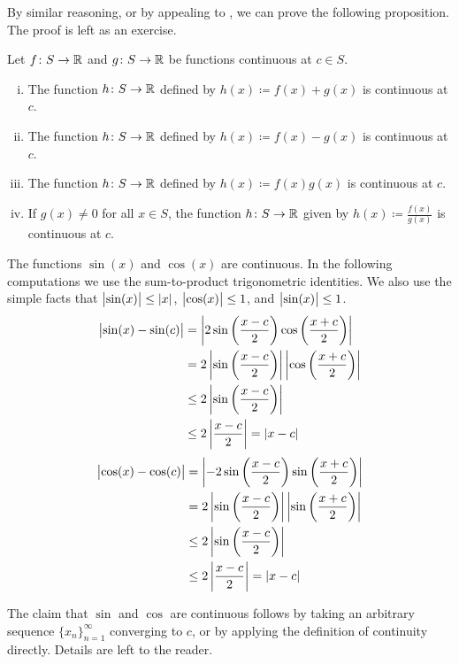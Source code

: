 By similar reasoning, or by appealing to ,
we can prove the following proposition.  The proof is left as an
exercise.

\begin{prop} \label{contalg:prop}
Let $f \colon S \to {\mathbb{R}}$ and $g \colon S \to {\mathbb{R}}$ be functions
continuous at $c \in S$.
\begin{enumerate}[(i)]
\item The function $h \colon S \to {\mathbb{R}}$ defined by
$h(x) \coloneqq f(x)+g(x)$ is continuous at $c$.
\item The function $h \colon S \to {\mathbb{R}}$ defined by
$h(x) \coloneqq f(x)-g(x)$ is continuous at $c$.
\item The function $h \colon S \to {\mathbb{R}}$ defined by
$h(x) \coloneqq f(x)g(x)$ is continuous at $c$.
\item If $g(x) \neq 0$ for all $x \in S$, the function $h \colon S \to {\mathbb{R}}$
given by $h(x) \coloneqq \frac{f(x)}{g(x)}$ is continuous at $c$.
\end{enumerate}
\end{prop}

\begin{example} \label{sincos:example}
The functions $\sin(x)$ and $\cos(x)$ are continuous.
In the following computations we use the sum-to-product
trigonometric identities.  We also use the simple facts that
$\bigl\lvert {\sin(x)} \bigr\rvert \leq \lvert {x} \rvert$, $\bigl\lvert {\cos(x)} \bigr\rvert \leq 1$,
and $\bigl\lvert {\sin(x)} \bigr\rvert \leq 1$.
\begin{equation*}
\begin{split}
\bigl\lvert {\sin(x)-\sin(c)} \bigr\rvert & =
\left\lvert {
2 \sin \left( \frac{x-c}{2} \right) \cos \left( \frac{x+c}{2} \right)
} \right\rvert
\\
& =
2
\left\lvert { \sin \left( \frac{x-c}{2} \right) } \right\rvert
\left\lvert { \cos \left( \frac{x+c}{2} \right) } \right\rvert
\\
& \leq
2
\left\lvert { \sin \left( \frac{x-c}{2} \right) } \right\rvert
\\
& \leq
2
\left\lvert { \frac{x-c}{2} } \right\rvert
= \lvert {x-c} \rvert
\end{split}
\end{equation*}
\begin{equation*}
\begin{split}
\bigl\lvert {\cos(x)-\cos(c)} \bigr\rvert & =
\left\lvert {
-2 \sin \left( \frac{x-c}{2} \right) \sin \left( \frac{x+c}{2} \right)
} \right\rvert
\\
& =
2
\left\lvert { \sin \left( \frac{x-c}{2} \right) } \right\rvert
\left\lvert { \sin \left( \frac{x+c}{2} \right) } \right\rvert
\\
& \leq
2
\left\lvert { \sin \left( \frac{x-c}{2} \right) } \right\rvert
\\
& \leq
2
\left\lvert { \frac{x-c}{2} } \right\rvert
= \lvert {x-c} \rvert
\end{split}
\end{equation*}

The claim that $\sin$ and $\cos$ are continuous follows by taking an
arbitrary sequence $\{ x_n \}_{n=1}^\infty$ converging to $c$, or by applying the
definition of continuity directly.  Details are left to the
reader.
\end{example}

